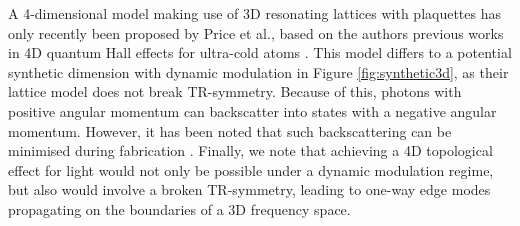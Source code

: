 A 4-dimensional model making use of 3D resonating lattices with plaquettes has only recently been proposed by Price et al., based on the authors previous works in 4D quantum Hall effects for ultra-cold atoms \cite{Price2015}. This model differs to a potential synthetic dimension with dynamic modulation in Figure \ref{fig:synthetic3d}, as their lattice model does not break TR-symmetry. Because of this, photons with positive angular momentum can backscatter into states with a negative angular momentum. However, it has been noted that such backscattering can be minimised during fabrication \cite{Hafezi2013a}. Finally, we note that achieving a 4D topological effect for light would not only be possible under a dynamic modulation regime, but also would involve a broken TR-symmetry, leading to one-way edge modes propagating on the boundaries of a 3D frequency space.
